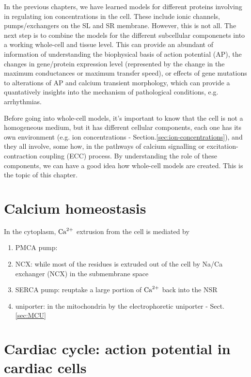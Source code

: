 In the previous chapters, we have learned models for different proteins
involving in regulating ion concentrations in the cell. These include ionic
channels, pumps/exchangers on the SL and SR membrane. However, this is not all.
The next step is to combine the models for the different subcellular componenets
into a working whole-cell and tissue level. This can provide an abundant of
information of understanding the biophysical basis of action potential (AP), the
changes in gene/protein expression level (represented by the change in the
maximum conductances or maximum transfer speed), or effects of gene mutations to
alterations of AP and calcium transient morphology, which can provide a
quantatively insights into the mechanism of pathological conditions, e.g.
arrhythmias. 

Before going into whole-cell models, it's important to know that the cell is not
a homogeneous medium, but it has different  cellular components, each one has
its own environment (e.g. ion concentrations -
Section.\ref{sec:ion-concentrations}), and they all involve, some how, in the
pathways of calcium signalling or excitation-contraction coupling (ECC) process.
By understanding the role of these components, we can have a good idea how
whole-cell models are created. This is the topic of this chapter.


\section{Calcium homeostasis}

In the cytoplasm, ${\text{Ca}^{2+}}$ extrusion from the cell is mediated by
\begin{enumerate}

  \item PMCA pump: 

  \item NCX: while most of the residues is extruded out of the cell by
Na/Ca exchanger (NCX) in the submembrane space

  \item SERCA pump: reuptake a large portion of ${\text{Ca}^{2+}}$
back into the NSR
 
   \item uniporter:  in the mitochondria by the electrophoretic uniporter -
   Sect.\ref{sec:MCU}
\end{enumerate}


\section{Cardiac cycle: action potential in cardiac cells}
\label{sec:AP-cardiac}
\label{sec:cardiac-cycle}
\label{sec:ECC}

